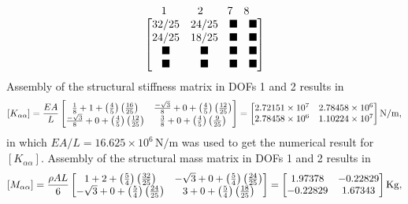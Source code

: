 \documentclass{AeroStructure-ERJohnson}
\begin{document}
\begin{example}
\begin{gather}
\begin{array}[b]{@{}l@{}}
\begin{array}{@{}l}
\hspace*{15pt}1 \hspace*{28pt}2 \hspace*{22pt}7 \hspace*{10pt}8
\end{array}\\
\left[\begin{array}{@{}cccc@{}}32/25 & 24/25 & \boldsymbol{\blacksquare} & \boldsymbol{\blacksquare} \\24/25 & 18/25 & \boldsymbol{\blacksquare} & \boldsymbol{\blacksquare} \\
\boldsymbol{\blacksquare} & \boldsymbol{\blacksquare}& \boldsymbol{\blacksquare}& \boldsymbol{\blacksquare}\\
\boldsymbol{\blacksquare} & \boldsymbol{\blacksquare}& \boldsymbol{\blacksquare}& \boldsymbol{\blacksquare}\end{array}\right]\end{array}\label{ex18.3c}
\end{gather}
Assembly of the structural stiffness matrix in DOFs 1 and 2 results in
\begin{align}\label{ex18.3d}
\left[K_{\alpha \alpha}\right]=\frac{E A}{L}\left[\begin{array}{@{}cc@{}}\frac{1}{8}+1+\left(\frac{4}{5}\right)\left(\frac{16}{25}\right) & \frac{-\sqrt{3}}{8}+0+\left(\frac{4}{5}\right)\left(\frac{12}{25}\right) \\\frac{-\sqrt{3}}{8}+0+\left(\frac{4}{5}\right)\left(\frac{12}{25}\right) & \frac{3}{8}+0+\left(\frac{4}{5}\right)\left(\frac{9}{25}\right)\end{array}\right]=\left[\begin{array}{@{}cc@{}}2.72151 \times 10^{7} & 2.78458 \times 10^{6} \\ 2.78458 \times 10^{6} & 1.10224 \times 10^{7}\end{array}\right] \mathrm{N}/\mathrm{m},
\end{align}
in which $E A/L=16.625 \times 10^{6}\,\mathrm{N}/\mathrm{m}$ was used to get the numerical result for $\left[K_{\alpha \alpha}\right]$. Assembly of the structural mass matrix in DOFs 1 and 2 results in
\begin{align}\label{ex18.3e}
\left[M_{\alpha \alpha}\right]=\frac{\rho A L}{6}\left[\begin{array}{@{}cc@{}}
1+2+\left(\frac{5}{4}\right)\left(\frac{32}{25}\right) & -\sqrt{3}+0+\left(\frac{5}{4}\right)\left(\frac{24}{25}\right) \\-\sqrt{3}+0+\left(\frac{5}{4}\right)\left(\frac{24}{25}\right) & 3+0+\left(\frac{5}{4}\right)\left(\frac{18}{25}\right)\end{array}\right]=\left[\begin{array}{@{}cc@{}}1.97378 & -0.22829 \\-0.22829 & 1.67343\end{array}\right] \mathrm{Kg},

\end{align}
\end{example}
\end{document}
